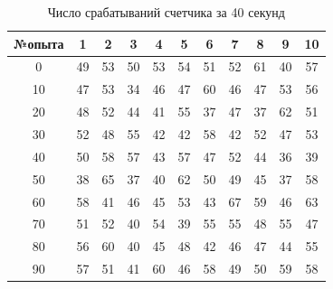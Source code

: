 \documentclass{article}
\begin{document}
\begin{table}[!h]
    \centering
    \begin{tabular}{|c|c|c|c|c|c|c|c|c|c|c|}
        \hline
         №опыта & 1 & 2 & 3 & 4 & 5 & 6 & 7 & 8 & 9 & 10 \\
         \hline
         0 & 49 & 53 & 50 & 53 & 54 & 51 & 52 & 61 & 40 & 57 \\
        10 & 47 & 53 & 34 & 46 & 47 & 60 & 46 & 47 & 53 & 56 \\
        20 & 48 & 52 & 44 & 41 & 55 & 37 & 47 & 37 & 62 & 51 \\
        30 & 52 & 48 & 55 & 42 & 42 & 58 & 42 & 52 & 47 & 53 \\
        40 & 50 & 58 & 57 & 43 & 57 & 47 & 52 & 44 & 36 & 39 \\
        50 & 38 & 65 & 37 & 40 & 62 & 50 & 49 & 45 & 37 & 58 \\
        60 & 58 & 41 & 46 & 45 & 53 & 43 & 67 & 59 & 46 & 63 \\
        70 & 51 & 52 & 40 & 54 & 39 & 55 & 55 & 48 & 55 & 47 \\
        80 & 56 & 60 & 40 & 45 & 48 & 42 & 46 & 47 & 44 & 55 \\
        90 & 57 & 51 & 41 & 60 & 46 & 58 & 49 & 50 & 59 & 58 \\
        \hline
    \end{tabular}
    \caption{Число срабатываний счетчика за 40 секунд}
\end{table}
\end{document}
